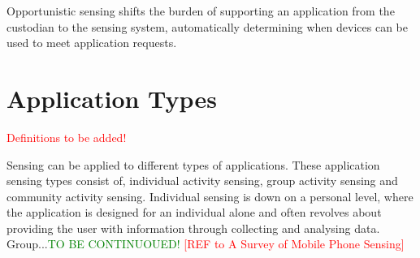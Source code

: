 \begin{defi}
Opportunistic sensing shifts the burden of supporting an application from the custodian to the sensing system, automatically determining when devices can be used to meet application requests. \cite{Lane:2008:USS:1411759.1411763} 
\end{defi}

%

    

   
            
    




\section{Application Types}

\textcolor{red}{Definitions to be added!}

Sensing can be applied to different types of applications. These application sensing types consist of, individual activity sensing, group activity sensing and community activity sensing. Individual sensing is down on a personal level, where the application is designed for an individual alone and often revolves about providing the user with information through collecting and analysing data. Group...\textcolor{green}{TO BE CONTINUOUED!}  \textcolor{red}{[REF to A Survey of Mobile Phone Sensing]}

